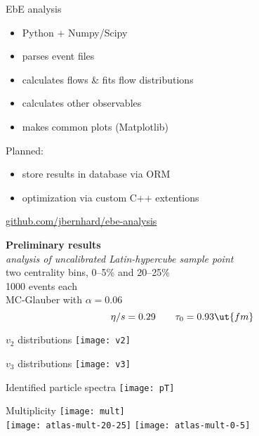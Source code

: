 \documentclass{beamer}
\begin{document}
\begin{frame}{EbE analysis}
  \begin{itemize}
    \item Python + Numpy/Scipy
    \item parses event files
    \item calculates flows \& fits flow distributions
    \item calculates other observables
    \item makes common plots (Matplotlib)
  \end{itemize}

  \mds
  Planned:
  \begin{itemize}
    \item store results in database via ORM
    \item optimization via custom C++ extentions
  \end{itemize}

  \bgs
  \flushright \footnotesize \url{github.com/jbernhard/ebe-analysis}
\end{frame}


\begin{frame}
  \centering
  \textbf{Preliminary results} \\ 
  \bgs
  \emph{analysis of uncalibrated Latin-hypercube sample point} \\
  \bgs 
  two centrality bins, 0--5\% and 20--25\% \\
  1000 events each \\
  \bgs
  MC-Glauber with $\alpha = 0.06$
  \begin{equation*}
    \eta/s = 0.29
    \qquad
    \tau_0 = 0.93 \ut{fm}
  \end{equation*}
\end{frame}


\begin{frame}{$v_2$ distributions}
  \centering
  \texttt{[image: v2]}
\end{frame}


\begin{frame}{$v_3$ distributions}
  \centering
  \texttt{[image: v3]}
\end{frame}


\begin{frame}{Identified particle spectra}
  \centering
  \texttt{[image: pT]}
\end{frame}


\begin{frame}{Multiplicity}
  \centering
  \texttt{[image: mult]} \\[-.4cm]
  \texttt{[image: atlas-mult-20-25]}
  \hspace{2cm}
  \texttt{[image: atlas-mult-0-5]}
\end{frame}
\end{document}
